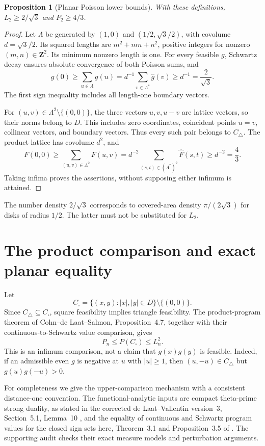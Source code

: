 \documentclass[11pt]{article}
\newtheorem{proposition}[theorem]{Proposition}
\newcommand{\Z}{\mathbf Z}
\begin{document}
\begin{proposition}[Planar Poisson lower bounds]\label{prop:poisson}
With these definitions, $L_2\ge2/\sqrt3$ and $P_2\ge4/3$.
\end{proposition}
\begin{proof}
Let $\Lambda$ be generated by $(1,0)$ and $(1/2,\sqrt3/2)$, with covolume $d=\sqrt3/2$. Its squared lengths are $m^2+mn+n^2$, positive integers for nonzero $(m,n)\in\Z^2$. Its minimum nonzero length is one. For every feasible $g$, Schwartz decay ensures absolute convergence of both Poisson sums, and
\[
 g(0)\ge\sum_{u\in\Lambda}g(u)
 =d^{-1}\sum_{v\in\Lambda^*}\widehat g(v)
 \ge d^{-1}=\frac2{\sqrt3}.
\]
The first sign inequality includes all length-one boundary vectors.

For $(u,v)\in\Lambda^2\setminus\{(0,0)\}$, the three vectors $u,v,u-v$ are lattice vectors, so their norms belong to $D$. This includes zero coordinates, coincident points $u=v$, collinear vectors, and boundary vectors. Thus every such pair belongs to $C_\triangle$. The product lattice has covolume $d^2$, and
\[
 F(0,0)\ge\sum_{(u,v)\in\Lambda^2}F(u,v)
 =d^{-2}\sum_{(s,t)\in(\Lambda^*)^2}\widehat F(s,t)
 \ge d^{-2}=\frac43.
\]
Taking infima proves the assertions, without supposing either infimum is attained.
\end{proof}

The number density $2/\sqrt3$ corresponds to covered-area density $\pi/(2\sqrt3)$ for disks of radius $1/2$. The latter must not be substituted for $L_2$.

\section{The product comparison and exact planar equality}
Let
\[
 C_\square=\{(x,y):|x|,|y|\in D\}\setminus\{(0,0)\}.
\]
Since $C_\triangle\subseteq C_\square$, square feasibility implies triangle feasibility. The product-program theorem of Cohn--de Laat--Salmon, Proposition~4.7, together with their continuous-to-Schwartz value comparison, gives
\begin{equation}\label{eq:product}
 P_n\le P(C_\square)\le L_n^2.
\end{equation}
This is an infimum comparison, not a claim that $g(x)g(y)$ is feasible. Indeed, if an admissible even $g$ is negative at $u$ with $|u|\ge1$, then $(u,-u)\in C_\triangle$ but $g(u)g(-u)>0$.

For completeness we give the upper-comparison mechanism with a consistent distance-one convention. The functional-analytic inputs are compact theta-prime strong duality, as stated in the corrected de Laat--Vallentin version~3, Section~5.1, Lemma~10 \cite{dlv}, and the equality of continuous and Schwartz program values for the closed sign sets here, Theorem~3.1 and Proposition~3.5 of \cite{cdls}. The supporting audit checks their exact measure models and perturbation arguments.
\end{document}

